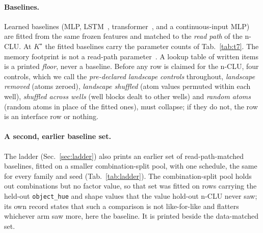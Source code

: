 \documentclass{article} %
\newcommand{\Kstar}{\ensuremath{K^{\star}}}
\begin{document}
\paragraph{Baselines.} Learned baselines (MLP, LSTM~\citep{hochreiter_long_1997}, transformer~\citep{vaswani_attention_2023}, and a
continuous-input MLP) are fitted from the same frozen features and matched to the
\emph{read path} of the n-CLU. At $\Kstar$ the fitted baselines carry the parameter counts of Tab.~\ref{tab:t7}.
The memory footprint is not a read-path parameter~\citep{borgeaud_improving_2022,khandelwal_generalization_2020,lample_large_2019}. A lookup table
of written items is a printed \emph{floor}, never a baseline. Before any row is claimed for the
n-CLU, four controls, which we call the \emph{pre-declared landscape controls} throughout, \emph{landscape removed} (atoms zeroed), \emph{landscape shuffled} (atom values permuted within each well), \emph{shuffled across wells}
(well blocks dealt to other wells) and \emph{random atoms} (random atoms in place of the fitted ones), must collapse; if they do
not, the row is an interface row or nothing.

\paragraph{A second, earlier baseline set.} The ladder (Sec.~\ref{sec:ladder}) also prints an earlier set
of read-path-matched baselines, fitted on a smaller combination-split pool, %
with one schedule, the same for %
every family and seed (Tab.~\ref{tab:ladder}). %
The combination-split pool holds out combinations but no factor value, so that set was fitted on
rows carrying the held-out \texttt{object\_hue} and shape values that the value hold-out n-CLU never
saw; its own record states that such a comparison is not like-for-like and flatters whichever arm
saw more, here the baseline. It is printed beside the data-matched set.
\end{document}
